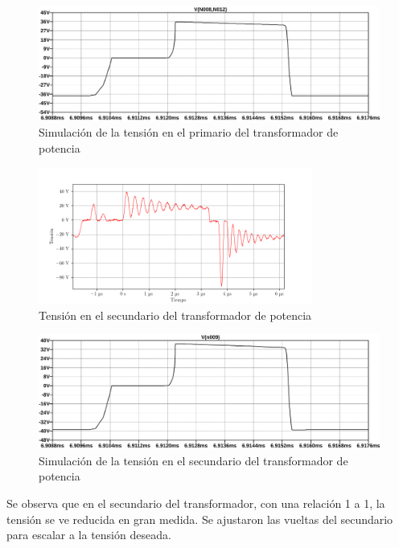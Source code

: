 \begin{figure}[H]
    \centering
    \includegraphics[width=\textwidth]{images/sim/19.pdf}
    \caption{Simulación de la tensión en el primario del transformador de potencia}
    \label{fig:sim:19}
\end{figure}

\begin{figure}[H]
    \centering
    \includegraphics[width=0.8\textwidth]{images/capturas-osciloscopio/17-11-2022/40.png}
    \caption{Tensión en el secundario del transformador de potencia}
    \label{fig:osc:40}
\end{figure}

\begin{figure}[H]
    \centering
    \includegraphics[width=\textwidth]{images/sim/20.pdf}
    \caption{Simulación de la tensión en el secundario del transformador de potencia}
    \label{fig:sim:20}
\end{figure}

Se observa que en el secundario del transformador, con una relación 1 a 1,
la tensión se ve reducida en gran medida.
Se ajustaron las vueltas del secundario para escalar a la tensión deseada.

